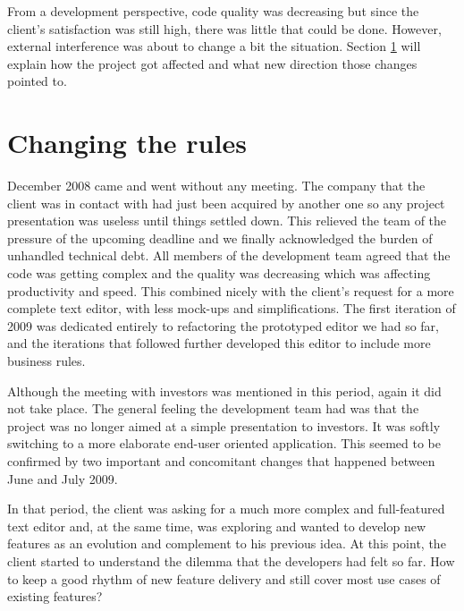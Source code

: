 \documentclass[lnbip]{svmultln}
\begin{document}
From a development perspective, code quality was decreasing but since
the client's satisfaction was still high, there was little that could
be done.  However, external interference was about to change a bit the
situation. Section \ref{sec:changes} will explain how the project got
affected and what new direction those changes pointed to.

\section{Changing the rules}
\label{sec:changes}

December 2008 came and went without any meeting. The company that the client was
in contact with had just been acquired by another one so any project
presentation was useless until things settled down. This relieved the team of
the pressure of the upcoming deadline and we finally acknowledged the burden of
unhandled technical debt. All members of the development team agreed that the
code was getting complex and the quality was decreasing which was affecting
productivity and speed. This combined nicely with the client's request for a
more complete text editor, with less mock-ups and simplifications. The first
iteration of 2009 was dedicated entirely to refactoring the prototyped editor we
had so far, and the iterations that followed further developed this editor to
include more business rules.

Although the meeting with investors was mentioned in this period, again it did
not take place. The general feeling the development team had was that the
project was no longer aimed at a simple presentation to investors. It was softly
switching to a more elaborate end-user oriented application. This seemed to be
confirmed by two important and concomitant changes that happened between June
and July 2009.

In that period, the client was asking for a much more complex and full-featured
text editor and, at the same time, was exploring and wanted to develop new
features as an evolution and complement to his previous idea. At this point, the
client started to understand the dilemma that the developers had felt so far.
How to keep a good rhythm of new feature delivery and still cover most use cases
of existing features?
\end{document}
